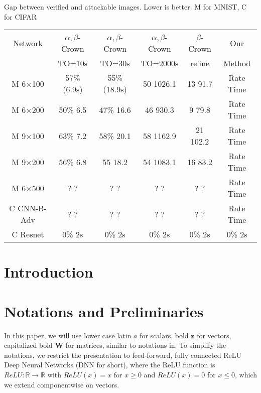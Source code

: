 \documentclass{article} %
\theoremstyle{definition}
\begin{document}
\vspace*{4ex}

Gap between verified and attackable images. Lower is better.
M for MNIST, C for CIFAR

\begin{tabular}{||c||c|c|c|c||c||}
	\hline \hline
	Network & $\alpha,\beta$-Crown & $\alpha,\beta$-Crown & $\alpha,\beta$-Crown & $\beta$-Crown & Our \\ 
	 & TO=10s & TO=30s & TO=2000s & refine & Method \\ 
	
	\hline

	
	M 6$\times$100 & 57\% (6.9s) & 55\% (18.9s) & 50 \hfill 1026.1 & 13 \hfill 91.7 & Rate \hfill Time \\ \hline
	M 6$\times$200 & 50\% \hfill 6.5 & 47\% \hfill 16.6 & 46 \hfill 930.3 & 9 \hfill 79.8 & Rate \hfill Time \\ \hline
	M 9$\times$100 & 63\% \hfill 7.2 & 58\% \hfill 20.1 & 58 \hfill 1162.9 & 21 \hfill 102.2 & Rate \hfill Time \\ \hline
	M 9$\times$200 & 56\% \hfill 6.8 & 55 \hfill 18.2 & 54 \hfill 1083.1 & 16 \hfill 83.2 & Rate \hfill Time \\ \hline
	M 6$\times$500 & ? \hfill ? & ? \hfill ? & ? \hfill ? & ? \hfill ? & Rate \hfill Time \\ \hline
	C CNN-B-Adv & ? \hfill ? & ? \hfill ? & ? \hfill ? & ? \hfill ? & Rate \hfill Time \\ \hline \hline
	C Resnet & 0\% \hfill 2s & 0\% \hfill 2s & 0\% \hfill 2s & 0\% \hfill 2s & 0\% \hfill 2s \\ \hline \hline
\end{tabular}


	\section{Introduction}


%


\section{Notations and Preliminaries}

In this paper, we will use lower case latin $a$ for scalars, bold $\boldsymbol{z}$ for vectors, 
capitalized bold $\boldsymbol{W}$ for matrices, similar to notations in.
To simplify the notations, we restrict the presentation to feed-forward, 
fully connected ReLU Deep Neural Networks (DNN for short), where the ReLU function is $ReLU : \mathbb{R} \rightarrow \mathbb{R}$ with
$ReLU(x)=x$ for $x \geq 0$ and $ReLU(x)=0$ for $x \leq 0$, which we extend componentwise on vectors.
\end{document}
